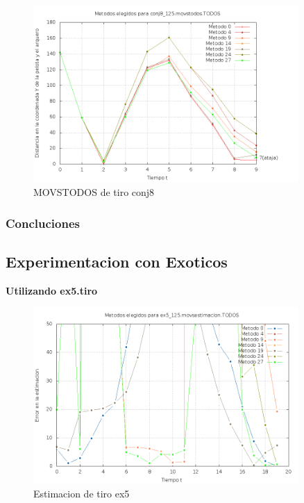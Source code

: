 \begin{figure}[H]
\begin{center}
\includegraphics[width=0.9\textwidth]{img/conj8_125_movstodos_TODOS_elegidos.png}
     \caption{MOVSTODOS de tiro conj8}
\end{center}
\end{figure}


\subsubsection{Concluciones}

\subsection{Experimentacion con Exoticos}

\textbf{Utilizando ex5.tiro}

\begin{figure}[H]
\begin{center}
\includegraphics[width=0.9\textwidth]{img/ex5_125_movsestimacion_TODOS_elegidos.png}
     \caption{Estimacion de tiro ex5}
\end{center}
\end{figure}

